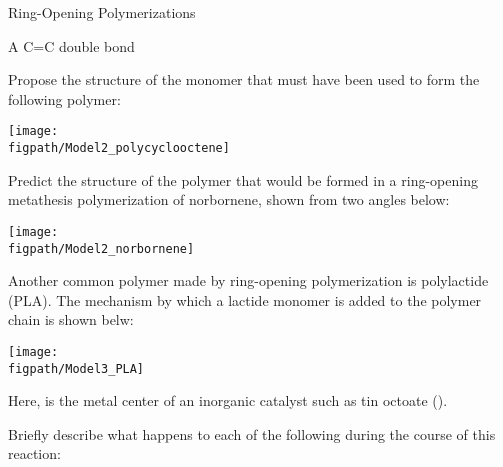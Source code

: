 \begin{activity}{Ring-Opening Polymerizations}
\begin{ctqs}
				\begin{solution}[0.5in]
					A C=C double bond
				\end{solution}
	
	\question Propose the structure of the monomer that must have been used to form the following polymer:
	
	\centerline{\texttt{[image: \\figpath/Model2\_polycyclooctene]}}
			
				\begin{solution}[1.25in]\end{solution}
	
	\question Predict the structure of the polymer that would be formed in a ring-opening metathesis polymerization of norbornene, shown from two angles below:
	
	\centerline{\texttt{[image: \\figpath/Model2\_norbornene]}}
			
				\begin{solution}[1.25in]\end{solution}
	
\end{ctqs}

\vspace{\fill}

\begin{model}[Polylactide]
	\label{\labelbase:mdl:PLA}

	Another common polymer made by ring-opening polymerization is polylactide (PLA).  The mechanism by which a lactide monomer is added to the polymer chain is shown belw:
	
	\centerline{\texttt{[image: \\figpath/Model3\_PLA]}}
	
	Here, \ce{[M]} is the metal center of an inorganic catalyst such as tin octoate ().
	
\end{model}

\clearpage
\begin{ctqs}
	
	\question Briefly describe what happens to each of the following during the course of this reaction:
	

\end{ctqs}
\end{activity}
